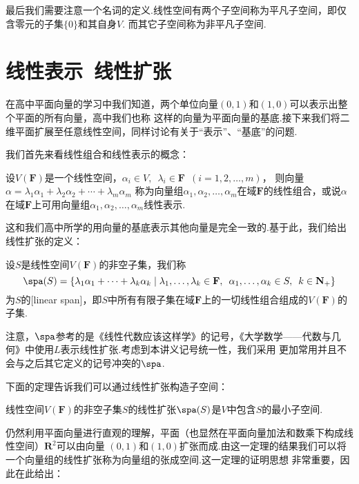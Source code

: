 最后我们需要注意一个名词的定义.线性空间有两个子空间称为平凡子空间，即仅含零元的子集$\{0\}$和其自身$V$.
而其它子空间称为非平凡子空间.

\section{线性表示\ 线性扩张}
在高中平面向量的学习中我们知道，两个单位向量$(0,1)$和$(1,0)$可以表示出整个平面的所有向量，高中我们也称
这样的向量为平面向量的基底.接下来我们将二维平面扩展至任意线性空间，同样讨论有关于``表示''、``基底''的问题.

我们首先来看线性组合和线性表示的概念：
\begin{definition}
    设$V(\mathbf{F})$是一个线性空间，$\alpha_i\in V,\enspace\lambda_i\in \mathbf{F}\enspace(i=1,2,\ldots,m)$，
    则向量$\alpha=\lambda_1\alpha_1+\lambda_2\alpha_2+\cdots+\lambda_m\alpha_m$
    称为向量组$\alpha_1,\alpha_2,\ldots,\alpha_m$在域$\mathbf{F}$的线性组合，或说$\alpha$
    在域$\mathbf{F}$上可用向量组$\alpha_1,\alpha_2,\ldots,\alpha_m$线性表示.
\end{definition}
这和我们高中所学的用向量的基底表示其他向量是完全一致的.基于此，我们给出线性扩张的定义：
\begin{definition}
    设$S$是线性空间$V(\mathbf{F})$的非空子集，我们称
    \[ \spa(S)=\{\lambda_1\alpha_1+\cdots+\lambda_k\alpha_k \mid \lambda_1,\ldots,\lambda_k\in\mathbf{F},\enspace\alpha_1,\ldots,\alpha_k\in S,\enspace k\in\mathbf{N_+}\} \]
    为$S$的[linear span]，即$S$中所有有限子集在域$\mathbf{F}$上的一切线性组合组成的$V(\mathbf{F})$的子集.
\end{definition}
注意，$\spa$参考的是《线性代数应该这样学》的记号，《大学数学——代数与几何》中使用$L$表示线性扩张.考虑到本讲义记号统一性，我们采用
更加常用并且不会与之后其它定义的记号冲突的$\spa$.

下面的定理告诉我们可以通过线性扩张构造子空间：
\begin{theorem}\label{thm:2:线性扩张构造子空间}
    线性空间$V(\mathbf{F})$的非空子集$S$的线性扩张$\spa(S)$是$V$中包含$S$的最小子空间.
\end{theorem}
仍然利用平面向量进行直观的理解，平面（也显然在平面向量加法和数乘下构成线性空间）$\mathbf{R}^2$可以由向量
$(0,1)$和$(1,0)$扩张而成.由这一定理的结果我们可以将一个向量组的线性扩张称为向量组的张成空间.这一定理的证明思想
非常重要，因此在此给出：

